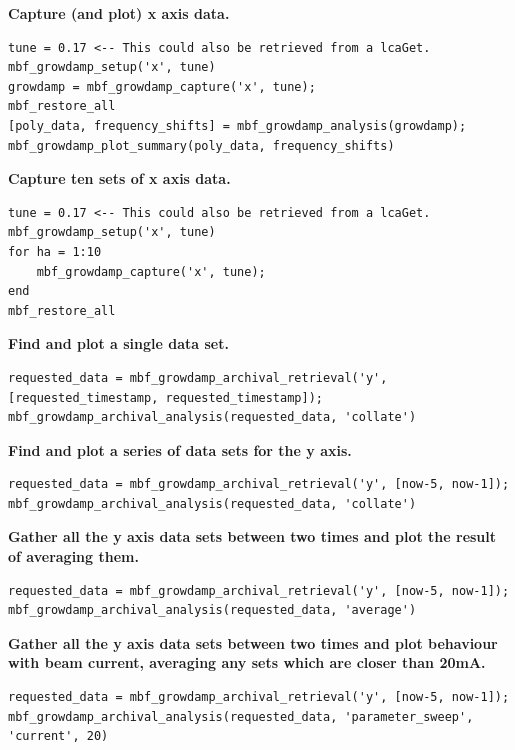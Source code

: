 \documentclass{report}
\begin{document}
\textbf{Capture (and plot) x axis data.}
\begin{verbatim}
tune = 0.17 <-- This could also be retrieved from a lcaGet.
mbf_growdamp_setup('x', tune)
growdamp = mbf_growdamp_capture('x', tune);
mbf_restore_all
[poly_data, frequency_shifts] = mbf_growdamp_analysis(growdamp);
mbf_growdamp_plot_summary(poly_data, frequency_shifts)
\end{verbatim}
\textbf{Capture ten sets of x axis data.}
\begin{verbatim}
tune = 0.17 <-- This could also be retrieved from a lcaGet.
mbf_growdamp_setup('x', tune)
for ha = 1:10
    mbf_growdamp_capture('x', tune);
end
mbf_restore_all
\end{verbatim}

\textbf{Find and plot a single data set.}
\begin{verbatim}
requested_data = mbf_growdamp_archival_retrieval('y', [requested_timestamp, requested_timestamp]);
mbf_growdamp_archival_analysis(requested_data, 'collate')
\end{verbatim}

\textbf{Find and plot a series of data sets for the y axis.}
\begin{verbatim}
requested_data = mbf_growdamp_archival_retrieval('y', [now-5, now-1]);
mbf_growdamp_archival_analysis(requested_data, 'collate')
\end{verbatim}

\textbf{Gather all the y axis data sets between two times and plot the result of averaging them.}
\begin{verbatim}
requested_data = mbf_growdamp_archival_retrieval('y', [now-5, now-1]);
mbf_growdamp_archival_analysis(requested_data, 'average')
\end{verbatim}

\textbf{Gather all the y axis data sets between two times and plot behaviour with beam current, averaging any sets which are closer than 20mA.}
\begin{verbatim}
requested_data = mbf_growdamp_archival_retrieval('y', [now-5, now-1]);
mbf_growdamp_archival_analysis(requested_data, 'parameter_sweep', 'current', 20)
\end{verbatim}
\end{document}
